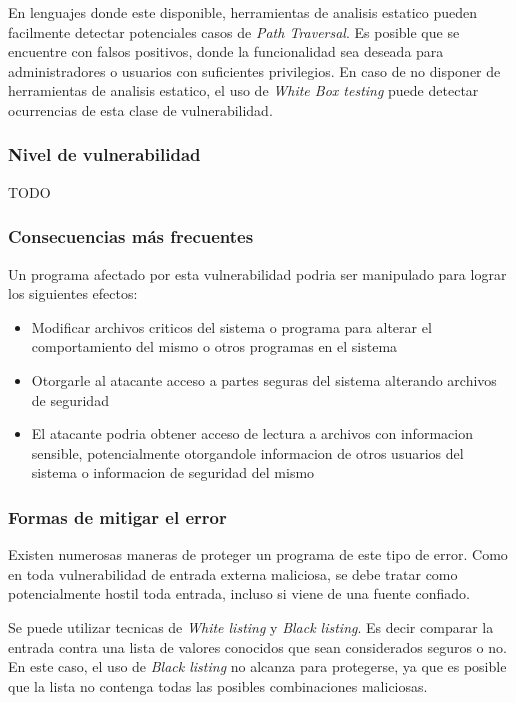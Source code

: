 En lenguajes donde este disponible, herramientas de analisis estatico pueden facilmente detectar potenciales casos de \textit{Path Traversal}. Es posible que se encuentre con falsos positivos, donde la funcionalidad sea deseada para administradores o usuarios con suficientes privilegios.
En caso de no disponer de herramientas de analisis estatico, el uso de \textit{White Box testing} puede detectar ocurrencias de esta clase de vulnerabilidad.

\subsubsection{Nivel de vulnerabilidad}

TODO

\subsubsection{Consecuencias más frecuentes}

Un programa afectado por esta vulnerabilidad podria ser manipulado para lograr los siguientes efectos:

\begin{itemize}

    \item Modificar archivos criticos del sistema o programa para alterar el comportamiento del mismo o otros programas en el sistema

    \item Otorgarle al atacante acceso a partes seguras del sistema alterando archivos de seguridad

    \item El atacante podria obtener acceso de lectura a archivos con informacion sensible, potencialmente otorgandole informacion de otros usuarios del sistema o informacion de seguridad del mismo

\end{itemize}

\subsubsection{Formas de mitigar el error}

Existen numerosas maneras de proteger un programa de este tipo de error.
Como en toda vulnerabilidad de entrada externa maliciosa, se debe tratar como potencialmente hostil toda entrada, incluso si viene de una fuente confiado.

Se puede utilizar tecnicas de \textit{White listing} y \textit{Black listing}.
Es decir comparar la entrada contra una lista de valores conocidos que sean considerados seguros o no.
En este caso, el uso de \textit{Black listing} no alcanza para protegerse, ya que es posible que la lista no contenga todas las posibles combinaciones maliciosas.


